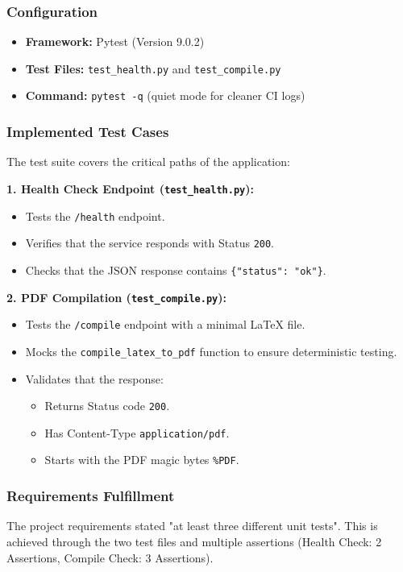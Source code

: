 \documentclass[BMR,Seminar,ngerman,IEEE]{twbook}
\begin{document}
\subsubsection{Configuration}
\begin{itemize}
    \item \textbf{Framework:} Pytest (Version 9.0.2)
    \item \textbf{Test Files:} \texttt{test\_health.py} and \texttt{test\_compile.py}
    \item \textbf{Command:} \texttt{pytest -q} (quiet mode for cleaner CI logs)
\end{itemize}

\subsubsection{Implemented Test Cases}
The test suite covers the critical paths of the application:

\textbf{1. Health Check Endpoint (\texttt{test\_health.py}):}
\begin{itemize}
    \item Tests the \texttt{/health} endpoint.
    \item Verifies that the service responds with Status \texttt{200}.
    \item Checks that the JSON response contains \texttt{\{"status": "ok"\}}.
\end{itemize}

\textbf{2. PDF Compilation (\texttt{test\_compile.py}):}
\begin{itemize}
    \item Tests the \texttt{/compile} endpoint with a minimal LaTeX file.
    \item Mocks the \texttt{compile\_latex\_to\_pdf} function to ensure deterministic testing.
    \item Validates that the response:
    \begin{itemize}
        \item Returns Status code \texttt{200}.
        \item Has Content-Type \texttt{application/pdf}.
        \item Starts with the PDF magic bytes \texttt{\%PDF}.
    \end{itemize}
\end{itemize}

\subsubsection{Requirements Fulfillment}
The project requirements stated "at least three different unit tests". This is achieved through the two test files and multiple assertions (Health Check: 2 Assertions, Compile Check: 3 Assertions).
\end{document}
